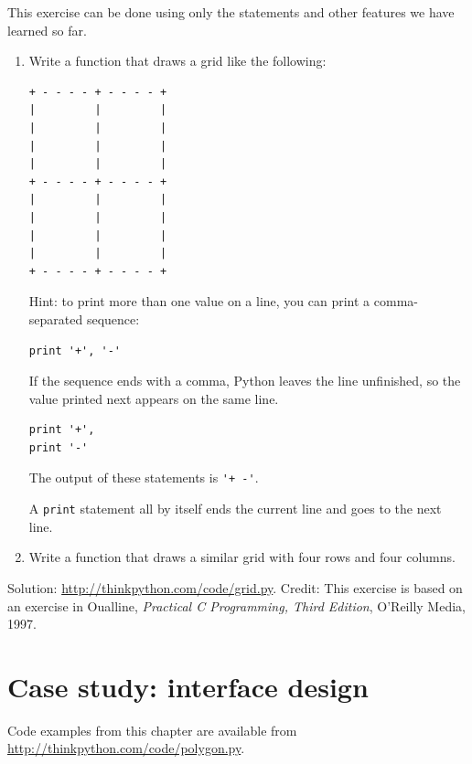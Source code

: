 \documentclass[10pt]{book}
\begin{document}
\begin{exercise}

This exercise can be
done using only the statements and other features we have learned so
far.  

\begin{enumerate}

\item Write a function that draws a grid like the following:

\begin{verbatim}
+ - - - - + - - - - +
|         |         |
|         |         |
|         |         |
|         |         |
+ - - - - + - - - - +
|         |         |
|         |         |
|         |         |
|         |         |
+ - - - - + - - - - +
\end{verbatim}
%
Hint: to print more than one value on a line, you can print
a comma-separated sequence:

\begin{verbatim}
print '+', '-'
\end{verbatim}
%
If the sequence ends with a comma, Python leaves the line unfinished,
so the value printed next appears on the same line.

\begin{verbatim}
print '+', 
print '-'
\end{verbatim}
%
The output of these statements is \verb"'+ -'".

A {\tt print} statement all by itself ends the current line and
goes to the next line.

\item Write a function that draws a similar grid
with four rows and four columns.

\end{enumerate}

Solution: \url{http://thinkpython.com/code/grid.py}.
Credit: This exercise is based on an exercise in Oualline, {\em
    Practical C Programming, Third Edition}, O'Reilly Media, 1997.

\end{exercise}





\chapter{Case study: interface design}
\label{turtlechap}

Code examples from this chapter are available from
\url{http://thinkpython.com/code/polygon.py}.
\end{document}
